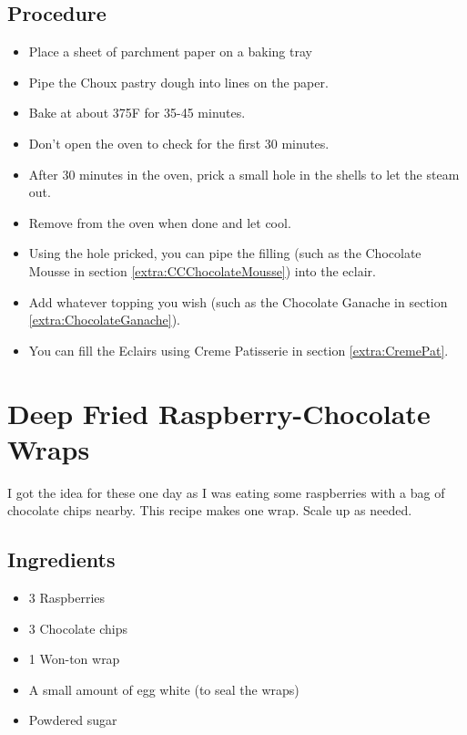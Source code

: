 \documentclass[10pt, openany]{book}
\begin{document}
\subsection{Procedure}
\begin{itemize}
  \item Place a sheet of parchment paper on a baking tray
  \item Pipe the Choux pastry dough into lines on the paper.
  \item Bake at about 375\degree{}F for 35-45 minutes.
  \item Don't open the oven to check for the first 30 minutes.
  \item After 30 minutes in the oven, prick a small hole in the shells to let the steam out.
  \item Remove from the oven when done and let cool.
  \item Using the hole pricked, you can pipe the filling (such as the Chocolate Mousse in section \ref{extra:CCChocolateMousse}) into the eclair.
  \item Add whatever topping you wish (such as the Chocolate Ganache in section \ref{extra:ChocolateGanache}).
  \item You can fill the Eclairs using Creme Patisserie in section \ref{extra:CremePat}.
\end{itemize}

\section{Deep Fried Raspberry-Chocolate Wraps}
\label{pastry:RaspberryChocolateWrap}
I got the idea for these one day as I was eating some raspberries with a bag of chocolate chips nearby.  This recipe makes one wrap.  Scale up as needed.
\subsection{Ingredients}
\begin{itemize}
  \item 3 Raspberries
  \item 3 Chocolate chips
  \item 1 Won-ton wrap
  \item A small amount of egg white (to seal the wraps)
  \item Powdered sugar
\end{itemize}
\end{document}
